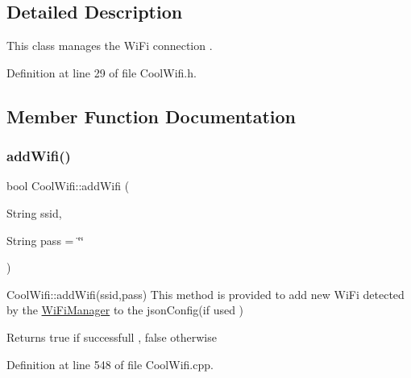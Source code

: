 \subsection{Detailed Description}
This class manages the Wi\+Fi connection . 

Definition at line 29 of file Cool\+Wifi.\+h.



\subsection{Member Function Documentation}
\mbox{\label{class_cool_wifi_a914d7a1df14dd6b75345fb614c34e9d6}} 
\subsubsection{\texorpdfstring{add\+Wifi()}{addWifi()}}
{\footnotesize\ttfamily bool Cool\+Wifi\+::add\+Wifi (\begin{DoxyParamCaption}\item[{String}]{ssid,  }\item[{String}]{pass = {\ttfamily \char`\"{}\char`\"{}} }\end{DoxyParamCaption})}

Cool\+Wifi\+::add\+Wifi(ssid,pass) This method is provided to add new Wi\+Fi detected by the \hyperlink{class_wi_fi_manager}{Wi\+Fi\+Manager} to the json\+Config(if used )

\begin{DoxyReturn}{Returns}
true if successfull , false otherwise 
\end{DoxyReturn}


Definition at line 548 of file Cool\+Wifi.\+cpp.


